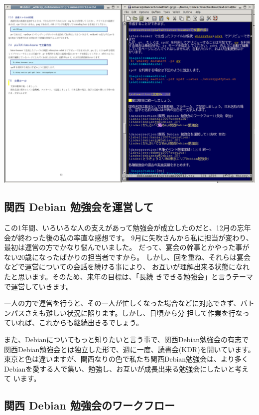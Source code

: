\documentclass[mingoth,a4paper]{jsarticle}
\begin{document}
\includegraphics[width=1\hsize]{image200712/whizzytex.png}


\label{sec:kansai2007operation}

\subsection{関西 Debian 勉強会を運営して}

この1年間、いろいろな人の支えがあって勉強会が成立したのだと、12月の忘年
会が終わった後の私の率直な感想です。
9月に矢吹さんから私に担当が変わり、最初は運営の方でかなり悩んでいました。
だって、宴会の幹事とかやった事がない20歳になったばかりの担当者ですから。
しかし、回を重ね、それらは宴会などで運営についての会話を続ける事により、
お互いが理解出来る状態になれたと思います。そのため、来年の目標は、「長続
きできる勉強会」と言うテーマで運営していきます。

一人の力で運営を行うと、その一人が忙しくなった場合などに対応できず、バト
ンパスさえも難しい状況に陥ります。しかし、日頃から分
担して作業を行なっていれば、これからも継続出きるでしょう。

また、Debianについてもっと知りたいと言う事で、関西Debian勉強会の有志で
関西Debian勉強会とは独立した形で、週に一度、読書会(KDR)を開いています。
東京と色は違いますが、関西なりの色で私たち関西Debian勉強会は、より多く
Debianを愛する人で集い、勉強し、お互いが成長出来る勉強会にしたいと考えて
います。

\subsection{関西 Debian 勉強会のワークフロー}
\end{document}
